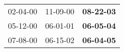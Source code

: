 \begin{supertabular}{p{0.33\columnwidth}p{0.33\columnwidth}p{0.33\columnwidth}}
 02-04-00\textsuperscript{} &  11-09-00\textsuperscript{} &  \textbf{08-22-03\textsuperscript{}} \\
 05-12-00\textsuperscript{} &  06-01-01\textsuperscript{} &  \textbf{06-05-04\textsuperscript{}} \\
 07-08-00\textsuperscript{} &  06-15-02\textsuperscript{} &  \textbf{06-04-05\textsuperscript{}} \\
\end{supertabular}
